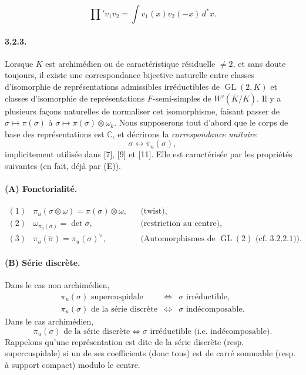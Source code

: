 \documentclass[10pt,a4paper]{article}
\providecommand{\GL}{\operatorname{GL}}
\providecommand{\sprod}{\mathop{\prod}\nolimits'}
\providecommand{\C}{\mathbb C}
\begin{document}
\clearpage
{}
\hypertarget{authority-42}{}
\[
\tag{3.2.2.4}
\sprod{v_1}{v_2}=\int v_1(x)v_2(-x)\,d^*x.
\]

\paragraph{3.2.3.} Lorsque \(K\) est archimédien ou de caractéristique résiduelle \(\ne2\), et sans doute toujours, il existe une correspondance bijective naturelle entre classes d'isomorphie de représentations admissibles irréductibles de \(\GL(2,K)\) et classes d'isomorphie de représentations \(F\)-semi-simples de \(W'(\overline K/K)\). Il y a plusieurs façons naturelles de normaliser cet isomorphisme, faisant passer de \(\sigma\mapsto\pi(\sigma)\) à \(\sigma\mapsto\pi(\sigma)\otimes\omega_k\). Nous supposerons tout d'abord que le corps de base des représentations est \(\C\), et décrirons la \emph{correspondance unitaire}
\[
\sigma\longleftrightarrow\pi_u(\sigma),
\]
implicitement utilisée dans [7], [9] et [11]. Elle est caractérisée par les propriétés suivantes (en fait, déjà par (E)).

\paragraph{(A) Fonctorialité.}
\[
\begin{array}{rlrl}
(1)&\pi_u(\sigma\otimes\omega)=\pi(\sigma)\otimes\omega,&&\text{(twist)},\\[0.35em]
(2)&\omega_{\pi_u(\sigma)}=\det\sigma,&&\text{(restriction au centre)},\\[0.35em]
(3)&\pi_u(\check\sigma)=\pi_u(\sigma)^\vee,&&\text{(Automorphismes de }\GL(2)\text{ (cf. 3.2.2.1)).}
\end{array}
\]

\paragraph{(B) Série discrète.} Dans le cas non archimédien,
\[
\begin{array}{rcl}
\pi_u(\sigma)\text{ supercuspidale}&\Longleftrightarrow&\sigma\text{ irréductible},\\
\pi_u(\sigma)\text{ de la série discrète}&\Longleftrightarrow&\sigma\text{ indécomposable}.
\end{array}
\]
Dans le cas archimédien,
\[
\pi_u(\sigma)\text{ de la série discrète}\Longleftrightarrow
\sigma\text{ irréductible (i.e. indécomposable)}.
\]
Rappelons qu'une représentation est dite de la série discrète (resp. supercuspidale) si un de ses coefficients (donc tous) est de carré sommable (resp. à support compact) modulo le centre.
\end{document}
